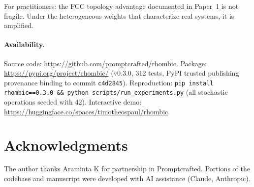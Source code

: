 \documentclass[11pt]{article}
\begin{document}
For practitioners: the FCC topology advantage documented in
Paper~1 is not fragile. Under the heterogeneous weights that
characterize real systems, it is amplified.

\paragraph{Availability.}
\begin{sloppypar}
Source code: \url{https://github.com/promptcrafted/rhombic}.
Package: \url{https://pypi.org/project/rhombic/} (v0.3.0, 312 tests,
PyPI trusted publishing provenance binding to commit
\texttt{c4d2845}).
Reproduction: \texttt{pip install rhombic==0.3.0 \&\& python
scripts/run\_experiments.py} (all stochastic operations seeded with 42).
Interactive demo: \url{https://huggingface.co/spaces/timotheospaul/rhombic}.
\end{sloppypar}

\section*{Acknowledgments}

The author thanks Araminta K for partnership in Promptcrafted.
Portions of the codebase and manuscript were developed with AI
assistance (Claude, Anthropic).



\end{document}
